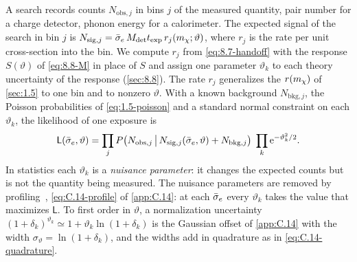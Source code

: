 A search records counts $N_{\mathrm{obs},j}$ in bins $j$ of the measured quantity, pair number for a charge detector, phonon energy for a calorimeter. The expected signal of the search in bin $j$ is $N_{\mathrm{sig},j} = \bar{\sigma}_{e}\,M_{\mathrm{det}}t_{\mathrm{exp}}\,r_j(m_{\chi};\vartheta)$, where $r_j$ is the rate per unit cross-section into the bin. We compute $r_j$ from \cref{eq:8.7-handoff} with the response $S(\vartheta)$ of \cref{eq:8.8-M} in place of $S$ and assign one parameter $\vartheta_k$ to each theory uncertainty of the response (\cref{sec:8.8}). The rate $r_j$ generalizes the $r(m_{\chi})$ of \cref{sec:1.5} to one bin and to nonzero $\vartheta$. With a known background $N_{\mathrm{bkg},j}$, the Poisson probabilities of \cref{eq:1.5-poisson} and a standard normal constraint on each $\vartheta_k$, the likelihood of one exposure is
\begin{equation}
  \mathsf{L}(\bar{\sigma}_{e},\vartheta) = \prod_j P\bigl(N_{\mathrm{obs},j}\,\big|\,N_{\mathrm{sig},j}(\bar{\sigma}_{e},\vartheta) + N_{\mathrm{bkg},j}\bigr)\;\prod_k\mathrm{e}^{-\vartheta_k^2/2} .
  \label{eq:8.8-like}
\end{equation}
In statistics each $\vartheta_k$ is a \emph{nuisance parameter}: it changes the expected counts but is not the quantity being measured. The nuisance parameters are removed by profiling~\cite[Eq.~(7)]{cowan2011asymptotic}, \cref{eq:C.14-profile} of \cref{app:C.14}: at each $\bar{\sigma}_{e}$ every $\vartheta_k$ takes the value that maximizes $\mathsf{L}$. To first order in $\vartheta$, a normalization uncertainty $(1 + \delta_k)^{\vartheta_k} \simeq 1 + \vartheta_k\ln(1 + \delta_k)$ is the Gaussian offset of \cref{app:C.14} with the width $\sigma_\vartheta = \ln(1 + \delta_k)$, and the widths add in quadrature as in \cref{eq:C.14-quadrature}.

